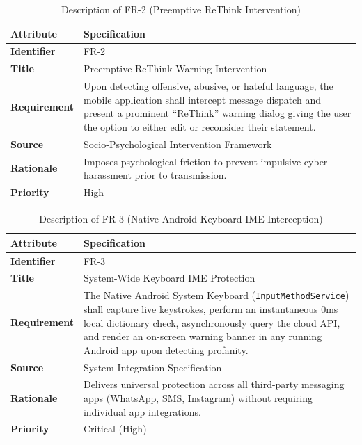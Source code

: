 \documentclass[A4paper,12pt]{report}
\theoremstyle{plain}
\theoremstyle{definition}
\theoremstyle{remark}
\numberwithin{equation}{section}
\begin{document}
\begin{table}[H]
\centering
\caption{Description of FR-2 (Preemptive ReThink Intervention)}
\renewcommand{\arraystretch}{1.3}
\begin{tabular}{|p{3.5cm}|p{10.5cm}|}
\hline
\textbf{Attribute} & \textbf{Specification} \\ \hline
\textbf{Identifier} & FR-2 \\ \hline
\textbf{Title} & Preemptive ReThink Warning Intervention \\ \hline
\textbf{Requirement} & Upon detecting offensive, abusive, or hateful language, the mobile application shall intercept message dispatch and present a prominent ``ReThink'' warning dialog giving the user the option to either edit or reconsider their statement. \\ \hline
\textbf{Source} & Socio-Psychological Intervention Framework \\ \hline
\textbf{Rationale} & Imposes psychological friction to prevent impulsive cyber-harassment prior to transmission. \\ \hline
\textbf{Priority} & High \\ \hline
\end{tabular}
\end{table}

\begin{table}[H]
\centering
\caption{Description of FR-3 (Native Android Keyboard IME Interception)}
\renewcommand{\arraystretch}{1.3}
\begin{tabular}{|p{3.5cm}|p{10.5cm}|}
\hline
\textbf{Attribute} & \textbf{Specification} \\ \hline
\textbf{Identifier} & FR-3 \\ \hline
\textbf{Title} & System-Wide Keyboard IME Protection \\ \hline
\textbf{Requirement} & The Native Android System Keyboard (\texttt{InputMethodService}) shall capture live keystrokes, perform an instantaneous 0ms local dictionary check, asynchronously query the cloud API, and render an on-screen warning banner in any running Android app upon detecting profanity. \\ \hline
\textbf{Source} & System Integration Specification \\ \hline
\textbf{Rationale} & Delivers universal protection across all third-party messaging apps (WhatsApp, SMS, Instagram) without requiring individual app integrations. \\ \hline
\textbf{Priority} & Critical (High) \\ \hline
\end{tabular}
\end{table}
\end{document}
